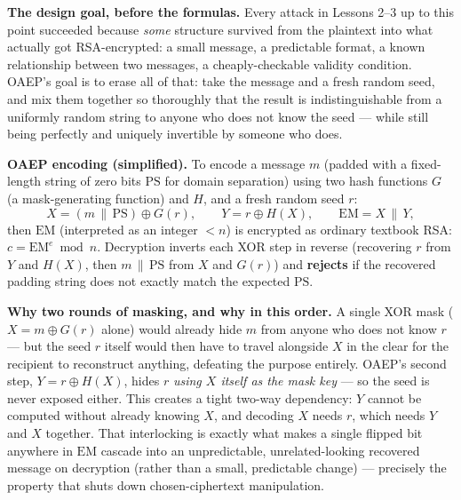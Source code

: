 \medskip\noindent\textbf{The design goal, before the formulas.} Every attack in Lessons 2--3 up to this point succeeded because \emph{some} structure survived from the plaintext into what actually got RSA-encrypted: a small message, a predictable format, a known relationship between two messages, a cheaply-checkable validity condition. OAEP's goal is to erase all of that: take the message and a fresh random seed, and mix them together so thoroughly that the result is indistinguishable from a uniformly random string to anyone who does not know the seed — while still being perfectly and uniquely invertible by someone who does.

\medskip\noindent\textbf{OAEP encoding (simplified).} To encode a message $m$ (padded with a fixed-length string of zero bits $\text{PS}$ for domain separation) using two hash functions $G$ (a mask-generating function) and $H$, and a fresh random seed $r$:
\[
X = (m \,\|\, \text{PS}) \oplus G(r), \qquad Y = r \oplus H(X), \qquad \text{EM} = X \,\|\, Y,
\]
then $\text{EM}$ (interpreted as an integer $< n$) is encrypted as ordinary textbook RSA: $c = \text{EM}^e \bmod n$. Decryption inverts each XOR step in reverse (recovering $r$ from $Y$ and $H(X)$, then $m \,\|\, \text{PS}$ from $X$ and $G(r)$) and \textbf{rejects} if the recovered padding string does not exactly match the expected $\text{PS}$.

\medskip\noindent\textbf{Why two rounds of masking, and why in this order.} A single XOR mask ($X=m\oplus G(r)$ alone) would already hide $m$ from anyone who does not know $r$ — but the seed $r$ itself would then have to travel alongside $X$ in the clear for the recipient to reconstruct anything, defeating the purpose entirely. OAEP's second step, $Y=r\oplus H(X)$, hides $r$ \emph{using $X$ itself as the mask key} — so the seed is never exposed either. This creates a tight two-way dependency: $Y$ cannot be computed without already knowing $X$, and decoding $X$ needs $r$, which needs $Y$ and $X$ together. That interlocking is exactly what makes a single flipped bit anywhere in $\text{EM}$ cascade into an unpredictable, unrelated-looking recovered message on decryption (rather than a small, predictable change) — precisely the property that shuts down chosen-ciphertext manipulation.

